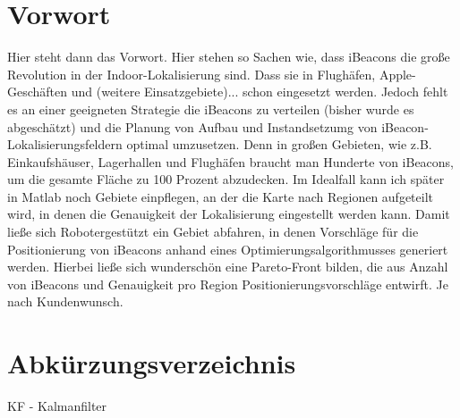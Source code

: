 \newpage%

\thispagestyle{empty}
\section*{}

\newpage%

\tableofcontents

\newpage%

\chapter*{Vorwort}
Hier steht dann das Vorwort. Hier stehen so Sachen wie, dass iBeacons die große Revolution in der Indoor-Lokalisierung sind. Dass sie in Flughäfen, Apple-Geschäften und (weitere Einsatzgebiete)... schon eingesetzt werden. Jedoch fehlt es an einer geeigneten Strategie die iBeacons zu verteilen (bisher wurde es abgeschätzt) und die Planung von Aufbau und Instandsetzumg von iBeacon-Lokalisierungsfeldern optimal umzusetzen. Denn in großen Gebieten, wie z.B. Einkaufshäuser, Lagerhallen und Flughäfen braucht man Hunderte von iBeacons, um die gesamte Fläche zu 100 Prozent abzudecken. Im Idealfall kann ich später in Matlab noch Gebiete einpflegen, an der die Karte nach Regionen aufgeteilt wird, in denen die Genauigkeit der Lokalisierung eingestellt werden kann. Damit ließe sich Robotergestützt ein Gebiet abfahren, in denen Vorschläge für die Positionierung von iBeacons anhand eines Optimierungsalgorithmusses generiert werden. Hierbei ließe sich wunderschön eine Pareto-Front bilden, die aus Anzahl von iBeacons und Genauigkeit pro Region Positionierungsvorschläge entwirft. Je nach Kundenwunsch.  

\newpage%

\listoffigures
{}

\newpage%

\chapter*{Abkürzungsverzeichnis}

KF - Kalmanfilter\\


\newpage%